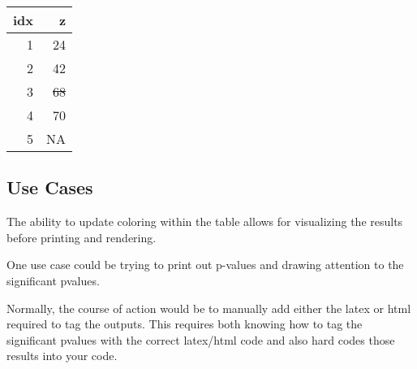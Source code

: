\documentclass[
]{article}
\newenvironment{Shaded}{\begin{snugshade}}{\end{snugshade}}
\newcommand{\CharTok}[1]{\textcolor[rgb]{0.31,0.60,0.02}{#1}}
\newcommand{\CommentTok}[1]{\textcolor[rgb]{0.56,0.35,0.01}{\textit{#1}}}
\newcommand{\DataTypeTok}[1]{\textcolor[rgb]{0.13,0.29,0.53}{#1}}
\newcommand{\FloatTok}[1]{\textcolor[rgb]{0.00,0.00,0.81}{#1}}
\newcommand{\KeywordTok}[1]{\textcolor[rgb]{0.13,0.29,0.53}{\textbf{#1}}}
\newcommand{\NormalTok}[1]{#1}
\newcommand{\OperatorTok}[1]{\textcolor[rgb]{0.81,0.36,0.00}{\textbf{#1}}}
\newcommand{\OtherTok}[1]{\textcolor[rgb]{0.56,0.35,0.01}{#1}}
\newcommand{\StringTok}[1]{\textcolor[rgb]{0.31,0.60,0.02}{#1}}
\begin{document}
\begin{Shaded}
\end{Shaded}

\begin{longtable}[]{@{}rr@{}}
\toprule
idx & z\tabularnewline
\midrule
\endhead
1 &
\colorbox[rgb]{0.0,0.0,1.0}{\textcolor[rgb]{1.0,0.0,0.0}{24}}\tabularnewline
2 & \colorbox[rgb]{1.0,1.0,0.0}{42}\tabularnewline
3 & \sout{\textcolor[rgb]{1.0,0.0,1.0}{68}}\tabularnewline
4 & \textcolor[rgb]{0.0,1.0,0.0}{70}\tabularnewline
5 & NA\tabularnewline
\bottomrule
\end{longtable}

\hypertarget{use-cases}{%
\subsection{Use Cases}\label{use-cases}}

The ability to update coloring within the table allows for visualizing
the results before printing and rendering.

One use case could be trying to print out p-values and drawing attention
to the significant pvalues.

Normally, the course of action would be to manually add either the latex
or html required to tag the outputs. This requires both knowing how to
tag the significant pvalues with the correct latex/html code and also
hard codes those results into your code.

\begin{Shaded}
\end{Shaded}
\end{document}
